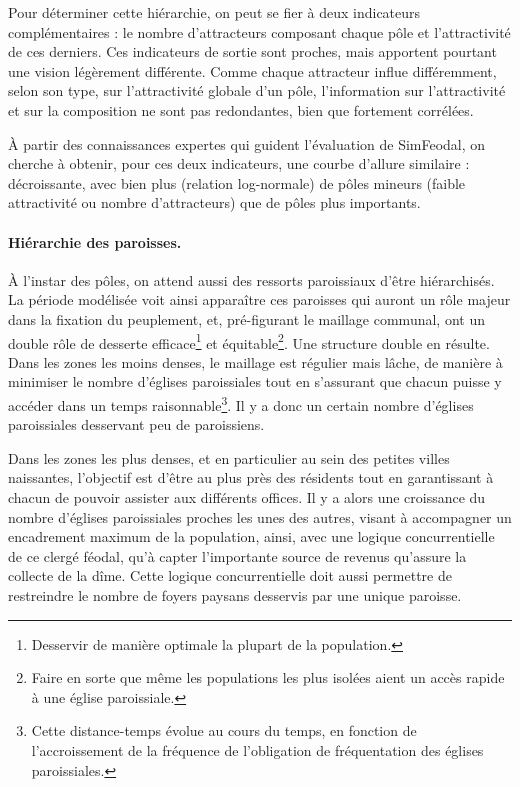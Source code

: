 Pour déterminer cette hiérarchie, on peut se fier à deux indicateurs complémentaires :
le nombre d'attracteurs composant chaque pôle et l'attractivité de ces derniers.
Ces indicateurs de sortie sont proches, mais apportent pourtant une vision légèrement différente.
Comme chaque attracteur influe différemment, selon son type, sur l'attractivité globale d'un pôle, l'information sur l'attractivité et sur la composition ne sont pas redondantes, bien que fortement corrélées.

À partir des connaissances expertes qui guident l'évaluation de SimFeodal, on cherche à obtenir, pour ces deux indicateurs, une courbe d'allure similaire : décroissante, avec bien plus (relation log-normale) de pôles mineurs (faible attractivité ou nombre d'attracteurs) que de pôles plus importants.

\paragraph{Hiérarchie des paroisses.}\label{par:hierarchie-paroisses}

À l'instar des pôles, on attend aussi des ressorts paroissiaux d'être hiérarchisés.
La période modélisée voit ainsi apparaître ces paroisses qui auront un rôle majeur dans la fixation du peuplement, et, pré-figurant le maillage communal, ont un double rôle de desserte efficace\footnote{
	Desservir de manière optimale la plupart de la population.
} et équitable\footnote{
Faire en sorte que même les populations les plus isolées aient un accès rapide à une église paroissiale.
}.
Une structure double en résulte.
Dans les zones les moins denses, le maillage est régulier mais lâche, de manière à minimiser le nombre d'églises paroissiales tout en s'assurant que chacun puisse y accéder dans un temps raisonnable\footnote{
	Cette distance-temps évolue au cours du temps, en fonction de l'accroissement de la fréquence de l'obligation de fréquentation des églises paroissiales.
}.
Il y a donc un certain nombre d'églises paroissiales desservant peu de paroissiens.

Dans les zones les plus denses, et en particulier au sein des petites villes naissantes, l'objectif est d'être au plus près des résidents tout en garantissant à chacun de pouvoir assister aux différents offices.
Il y a alors une croissance du nombre d'églises paroissiales proches les unes des autres, visant à accompagner un encadrement maximum de la population, ainsi, avec une logique concurrentielle de ce clergé féodal, qu'à capter l'importante source de revenus qu'assure la collecte de la dîme.
Cette logique concurrentielle doit aussi permettre de restreindre le nombre de foyers paysans desservis par une unique paroisse.

